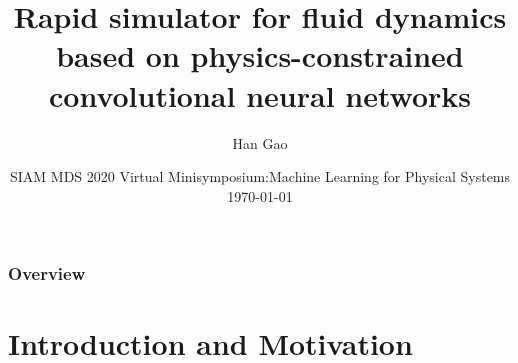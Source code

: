 \documentclass{beamer}
\title[Apply CNN to solve fluid problem]{Rapid simulator for fluid dynamics based on physics-constrained convolutional neural networks} %
\author{Han Gao} %
\institute[Notre Dame] %
{
Aerospace and Mechanical Engineering
\newline
Center of Informatics and Computational Science
\newline
University of Notre Dame
\\%
\medskip
\textit{hgao1@nd.edu} %
}
\date{SIAM MDS 2020 Virtual Minisymposium:\newline Machine Learning for Physical Systems
	\newline\today} %
\begin{document}
\begin{frame}
\titlepage %
\end{frame}

\begin{frame}
\frametitle{Overview} %
\tableofcontents %
\end{frame}


\section{Introduction and Motivation} %
\end{document}
